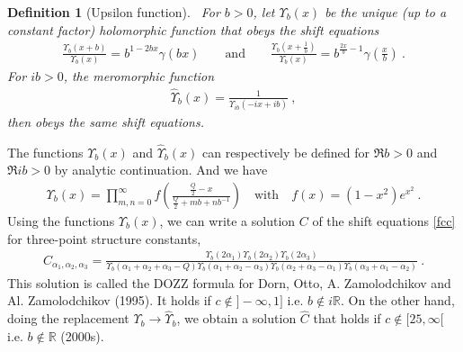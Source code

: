 \documentclass[12pt, a4paper]{article}
\theoremstyle{break}
\newtheorem{defn}[exo]{Definition}
\begin{document}
\begin{defn}[Upsilon function]
~\label{def:upsilon}
 For $b>0$, let $\Upsilon_b(x)$ be the unique (up to a constant factor) holomorphic function that obeys the shift equations
 \begin{align}
  \frac{\Upsilon_b(x+b)}{\Upsilon_b(x)} = b^{1-2bx} \gamma(bx)\qquad \text{and} \qquad \frac{\Upsilon_b(x+\frac{1}{b})}{\Upsilon_b(x)} = b^{\frac{2x}{b}-1} \gamma(\tfrac{x}{b})\ .
\label{upup}
\end{align}
For $ib>0$, the meromorphic function 
\begin{align}
 \hat{\Upsilon}_b(x) = \frac{1}{\Upsilon_{ib}(-ix+ib)}\ ,
\end{align}
then obeys the same shift equations.
\end{defn}
The functions $\Upsilon_b(x)$ and $\hat\Upsilon_b(x)$ can respectively be defined for $\Re b>0$ and $\Re ib>0$ by analytic continuation. And we have 
\begin{align}
 \Upsilon_b(x) = \prod_{m,n=0}^\infty f\left(\frac{\frac{Q}{2}-x}{\frac{Q}{2}+mb+nb^{-1}}\right) \quad \text{with} \quad f(x)=(1-x^2)e^{x^2}\ .
\end{align}
Using the functions $\Upsilon_b(x)$, we can write a solution $C$ of the shift equations \eqref{fcc} for three-point structure constants,
\begin{align}
 C_{\alpha_1,\alpha_2,\alpha_3} =  \frac{ \Upsilon_b(2\alpha_1) \Upsilon_b(2\alpha_2) \Upsilon_b(2\alpha_3)}{\Upsilon_b(\alpha_1+\alpha_2+\alpha_3-Q) \Upsilon_b(\alpha_1+\alpha_2-\alpha_3)\Upsilon_b(\alpha_2+\alpha_3-\alpha_1)\Upsilon_b(\alpha_3+\alpha_1-\alpha_2)} \ .
\label{caaa}
\end{align}
This solution is called the DOZZ formula for Dorn, Otto, A.
Zamolodchikov and Al. Zamolodchikov (1995). It holds if
$c\notin ]-\infty, 1]$ i.e. $b\notin i\mathbb{R}$. 
On the other hand, doing the replacement $\Upsilon_b\to \hat\Upsilon_b$, we obtain a solution $\hat C$ that holds if  $c\notin [25,\infty[$ i.e. $b\notin \mathbb{R}$ (2000s).
\end{document}
